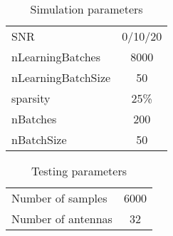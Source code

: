 \documentclass[a8paper,conference]{report}
\begin{document}
\clearpage
\begin{table}[!hb]
	\centering
	\caption{Simulation parameters}
	\begin{tabular}{|l|c|}
	\hline
	SNR 					& 0/10/20 \\
	nLearningBatches 		& 8000 \\
	nLearningBatchSize 		& 50 \\
	sparsity 				& 25\% \\
	nBatches   				& 200 \\
	nBatchSize 				& 50 \\
	\hline
	\end{tabular}
\end{table}
\begin{table}[!hb]
	\centering
	\caption{Testing parameters}
	\begin{tabular}{|l|c|}
	\hline
	Number of samples       & 6000 \\
	Number of antennas 		& 32 \\
	\hline
	\end{tabular}
\end{table}
\end{document}
